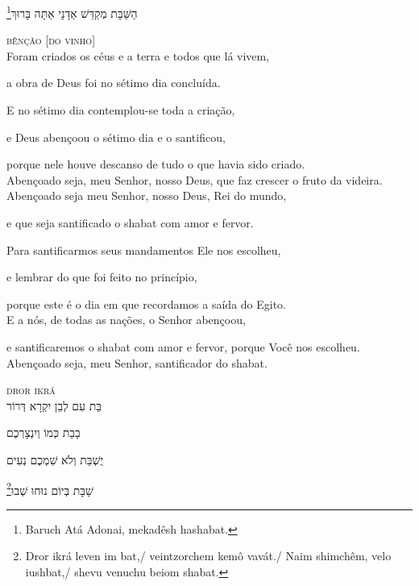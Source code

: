 \footnote{Baruch Atá Adonai, mekadêsh hashabat.}הַשַּׁבָּת מְקַדֵּשׁ אַדָנָי אַתָּה בָּרוּךְ

\movetooddpage
\raggedright

\vspace*{1cm}

\textsc{bênção [do vinho]}\\[15pt]

Foram criados os céus e a terra e todos que lá vivem,

a obra de Deus foi no sétimo dia concluída.

E no sétimo dia contemplou-se toda a criação,

e Deus abençoou o sétimo dia e o santificou,

porque nele houve descanso de tudo o que havia sido criado.\\[10pt]

Abençoado seja, meu Senhor, nosso Deus, que faz crescer o fruto da
videira.\\[10pt]

Abençoado seja meu Senhor, nosso Deus, Rei do mundo,

e que seja santificado o shabat com amor e fervor.

Para santificarmos seus mandamentos Ele nos escolheu,

e lembrar do que foi feito no princípio,

porque este é o dia em que recordamos a saída do Egito.\\[10pt]

E a nós, de todas as nações, o Senhor abençoou,

e santificaremos o shabat com amor e fervor, porque Você nos escolheu.\\[10pt]


Abençoado seja, meu Senhor, santificador do shabat.


\movetoevenpage
\raggedleft
{}

\vspace*{1cm}

\textsc{dror ikrá}\\[15pt]


בַּת עִם לְבֵן יִקְרָא דְּרוֹר

בָבַת כְּמוֹ וְיִנְצָרְכֶם

יֻשְׁבַּת וְלֹא שִׁמְכֶם נְעִים

\footnote{Dror ikrá leven im bat,/ veintzorchem kemô vavát./ Naim shimchêm, velo iushbat,/ shevu venuchu beiom shabat.}שַׁבָּת בְּיוֹם נוּחוּ שְׁבוּ\\[10pt]


